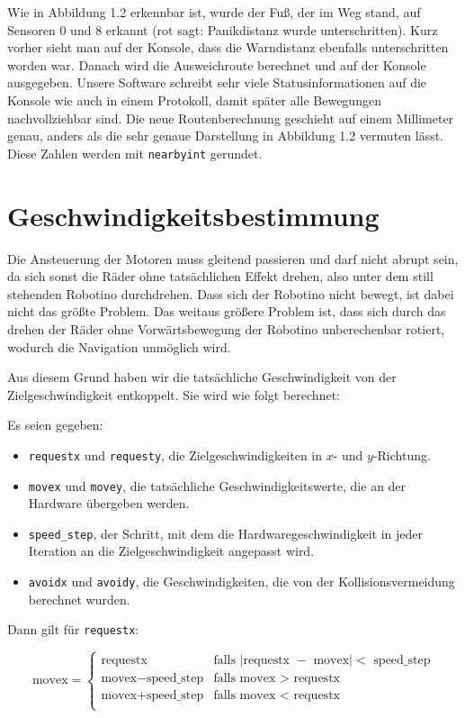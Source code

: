
Wie in Abbildung 1.2 erkennbar ist, wurde der Fuß, der im Weg stand, auf
Sensoren 0 und 8 erkannt (rot sagt: Panikdistanz wurde unterschritten). Kurz
vorher sieht man auf der Konsole, dass die Warndistanz ebenfalls unterschritten
worden war. Danach wird die Ausweichroute berechnet und auf der Konsole
ausgegeben. Unsere Software schreibt sehr viele Statusinformationen auf die
Konsole wie auch in einem Protokoll, damit später alle Bewegungen
nachvollziehbar sind. Die neue Routenberechnung geschieht auf einem Millimeter
genau, anders als die sehr genaue Darstellung in Abbildung 1.2 vermuten lässt.
Diese Zahlen werden mit \verb|nearbyint| gerundet.


\section{Geschwindigkeitsbestimmung}

Die Ansteuerung der Motoren muss gleitend passieren und darf nicht abrupt sein,
da sich sonst die Räder ohne tatsächlichen Effekt drehen, also unter dem still
stehenden Robotino durchdrehen. Dass sich der Robotino nicht bewegt, ist dabei
nicht das größte Problem. Das weitaus größere Problem ist, dass sich durch das
drehen der Räder ohne Vorwärtsbewegung der Robotino unberechenbar rotiert,
wodurch die Navigation unmöglich wird.

Aus diesem Grund haben wir die tatsächliche Geschwindigkeit von der
Zielgeschwindigkeit entkoppelt. Sie wird wie folgt berechnet:

Es seien gegeben:

\begin{itemize}
	\item \verb|requestx| und \verb|requesty|, die Zielgeschwindigkeiten in $x$-
		und $y$-Richtung.
	\item \verb|movex| und \verb|movey|, die tatsächliche Geschwindigkeitswerte,
		die an der Hardware übergeben werden.
	\item \verb|speed_step|, der Schritt, mit dem die Hardwaregeschwindigkeit in
		jeder Iteration an die Zielgeschwindigkeit angepasst wird.
	\item \verb|avoidx| und \verb|avoidy|, die Geschwindigkeiten, die von der
		Kollisionsvermeidung berechnet wurden.
\end{itemize}

Dann gilt für \verb|requestx|:

\[
	\text{movex} = \left\{ \begin{array}{rl}
		\text{requestx}							& \mbox{falls $|$requestx $-$ movex$| <$ speed\_step}	\\
		\text{movex} - \text{speed\_step}	& \mbox{falls movex $>$ requestx}							\\
		\text{movex} + \text{speed\_step}	& \mbox{falls movex $<$ requestx}							\\
	\end{array} \right.
\]

